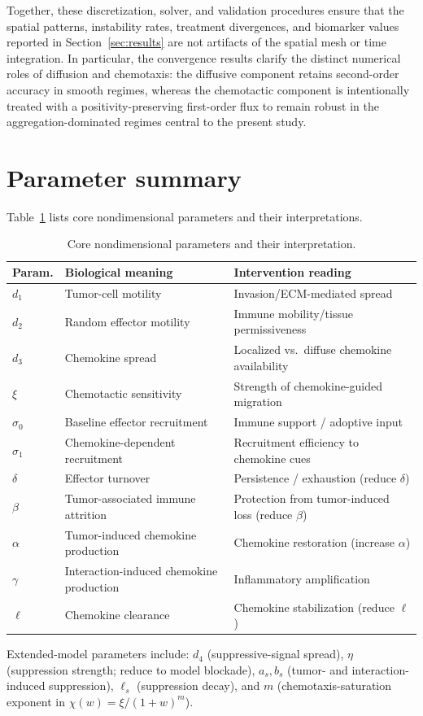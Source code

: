 \documentclass[]{interact}
\theoremstyle{plain}%
\theoremstyle{definition}
\theoremstyle{remark}
\begin{document}
Together, these discretization, solver, and validation procedures ensure that
the spatial patterns, instability rates, treatment divergences, and biomarker
values reported in Section~\ref{sec:results} are not artifacts of the spatial
mesh or time integration. In particular, the convergence results clarify the
distinct numerical roles of diffusion and chemotaxis: the diffusive component
retains second-order accuracy in smooth regimes, whereas the chemotactic
component is intentionally treated with a positivity-preserving first-order
flux to remain robust in the aggregation-dominated regimes central to the
present study.

\section{Parameter summary}\label{app:parameters}
Table~\ref{tab:core_parameters} lists core nondimensional parameters and their interpretations.

\begin{table}[htbp]
\centering
\caption{Core nondimensional parameters and their interpretation.}
\label{tab:core_parameters}
\renewcommand{\arraystretch}{1.15}
\begin{tabular}{p{}p{}p{}}
\toprule
\textbf{Param.} & \textbf{Biological meaning} & \textbf{Intervention reading}\\
\midrule
$d_1$ & Tumor-cell motility & Invasion/ECM-mediated spread\\
$d_2$ & Random effector motility & Immune mobility/tissue permissiveness\\
$d_3$ & Chemokine spread & Localized vs.\ diffuse chemokine availability\\
$\xi$ & Chemotactic sensitivity & Strength of chemokine-guided migration\\
$\sigma_0$ & Baseline effector recruitment & Immune support / adoptive input\\
$\sigma_1$ & Chemokine-dependent recruitment & Recruitment efficiency to chemokine cues\\
$\delta$ & Effector turnover & Persistence / exhaustion (reduce $\delta$)\\
$\beta$ & Tumor-associated immune attrition & Protection from tumor-induced loss (reduce $\beta$)\\
$\alpha$ & Tumor-induced chemokine production & Chemokine restoration (increase $\alpha$)\\
$\gamma$ & Interaction-induced chemokine production & Inflammatory amplification\\
$\ell$ & Chemokine clearance & Chemokine stabilization (reduce $\ell$)\\
\bottomrule
\end{tabular}
\end{table}

Extended-model parameters include: $d_4$ (suppressive-signal spread), $\eta$ (suppression
strength; reduce to model blockade), $a_s,b_s$ (tumor- and interaction-induced
suppression), $\ell_s$ (suppression decay), and $m$ (chemotaxis-saturation
exponent in $\chi(w)=\xi/(1+w)^m$).



\end{document}
